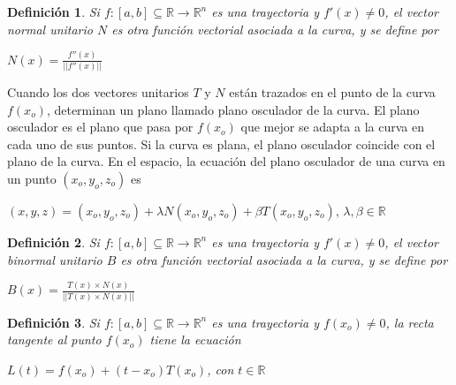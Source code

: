 \documentclass{book}
\newtheorem{definition}{Definición}[section]
\begin{document}
\begin{definition}
Si $f:[a,b]\subseteq \mathbb{R} \rightarrow \mathbb{R}^n$ es una trayectoria y $f'(x)\neq 0$, el vector normal unitario $N$ es otra función vectorial asociada a la curva, y se define por
\begin{center}
    $N(x)=\frac{f''(x)}{||f''(x)||}$
\end{center}
\end{definition}
Cuando los dos vectores unitarios $T$ y $N$ están trazados en el punto de la curva $f(x_o)$, determinan un plano llamado plano osculador de la curva. El plano osculador es el plano que pasa por $f(x_o)$ que mejor se adapta a la curva en cada uno de sus puntos. Si la curva es plana, el plano osculador coincide con el plano de la curva. En el espacio, la ecuación del plano osculador de una curva en un punto $(x_o,y_o,z_o)$ es
\begin{center}
    $(x,y,z)=(x_o,y_o,z_o)+\lambda N(x_o,y_o,z_o)+\beta T(x_o,y_o,z_o)$, $\lambda, \beta \in \mathbb{R}$
\end{center}
\begin{definition}
Si $f:[a,b]\subseteq \mathbb{R} \rightarrow \mathbb{R}^n$ es una trayectoria y $f'(x)\neq 0$, el vector binormal unitario $B$ es otra función vectorial asociada a la curva, y se define por
\begin{center}
    $B(x)=\frac{T(x)\times N(x)}{||T(x)\times N(x)||}$
\end{center}
\end{definition}
\begin{definition}
Si $f:[a,b]\subseteq \mathbb{R} \rightarrow \mathbb{R}^n$ es una trayectoria y $f(x_o)\neq 0$, la recta tangente al punto $f(x_o)$ tiene la ecuación
\begin{center}
    $L(t)=f(x_o)+(t-x_o)T(x_o)$, con $t\in \mathbb{R}$
\end{center}
\end{definition}
\end{document}
